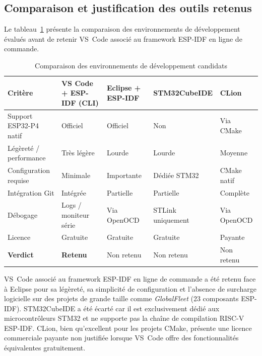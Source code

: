 \subsection{Comparaison et justification des outils retenus}
\label{subsec:justif_outils}

Le tableau~\ref{tab:tools_comparison} présente la comparaison des
environnements de développement évalués avant de retenir VS~Code
associé au framework ESP-IDF en ligne de commande.

\begin{table}[H]
\centering
\renewcommand{\arraystretch}{1.6}
\caption{Comparaison des environnements de développement candidats}
\label{tab:tools_comparison}
\footnotesize
\begin{tabular}{|p{3.0cm}|p{2.5cm}|p{2.5cm}|p{2.5cm}|p{2.0cm}|}
\hline
\rowcolor{gray!20}
\textbf{Critère} & \textbf{VS Code + ESP-IDF (CLI)} & \textbf{Eclipse + ESP-IDF} & \textbf{STM32CubeIDE} & \textbf{CLion} \\
\hline
Support ESP32-P4 natif & Officiel & Officiel & Non & Via CMake \\
\hline
Légèreté / performance & Très légère & Lourde & Lourde & Moyenne \\
\hline
Configuration requise & Minimale & Importante & Dédiée STM32 & CMake natif \\
\hline
Intégration Git & Intégrée & Partielle & Partielle & Complète \\
\hline
Débogage & Logs / moniteur série & Via OpenOCD & STLink uniquement & Via OpenOCD \\
\hline
Licence & Gratuite & Gratuite & Gratuite & Payante \\
\hline
\rowcolor{green!15}
\textbf{Verdict} & \textbf{Retenu} & Non retenu & Non retenu & Non retenu \\
\hline
\end{tabular}
\end{table}

VS~Code associé au framework ESP-IDF en ligne de commande a été
retenu face à Eclipse pour sa légèreté, sa simplicité de configuration
et l'absence de surcharge logicielle sur des projets de grande taille
comme \textit{GlobalFleet} (23 composants ESP-IDF). STM32CubeIDE a été
écarté car il est exclusivement dédié aux microcontrôleurs STM32 et
ne supporte pas la chaîne de compilation RISC-V ESP-IDF.
CLion, bien qu'excellent pour les projets CMake, présente une licence
commerciale payante non justifiée lorsque VS~Code offre des
fonctionnalités équivalentes gratuitement.

